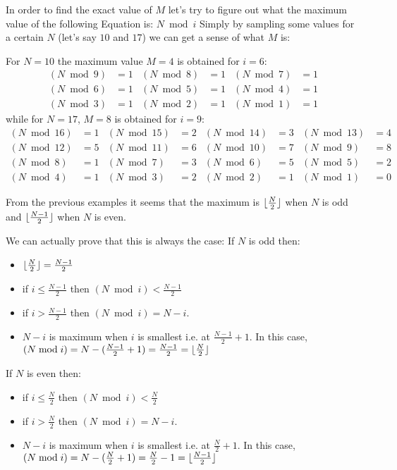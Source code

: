 In order to find the exact value of $M$ let's try to figure out what the maximum value of the following Equation is: $N \bmod{i}$
Simply by sampling some values for a certain $N$ (let's say $10$ and $17$) we can get a sense of what $M$ is:

For $N=10$ the maximum value $M=4$ is obtained for $i=6$:
\begin{align*}
	(N \bmod{9}) &= 1  & (N \bmod{8}) &= 1 & (N \bmod{7}) &= 1 \\
	(N \bmod{6}) &= 1  & (N \bmod{5}) &= 1 & (N \bmod{4}) &= 1 \\
	(N \bmod{3}) &= 1  & (N \bmod{2}) &= 1 & (N \bmod{1}) &= 1 
\end{align*}
while for $N=17$, $M=8$ is obtained for $i=9$:
\begin{align*}
	(N \bmod{16}) &= 1  & (N \bmod{15}) &= 2 & (N \bmod{14}) &= 3 & (N \bmod{13}) &= 4 \\
	(N \bmod{12}) &= 5  & (N \bmod{11}) &= 6 & (N \bmod{10}) &= 7 & (N \bmod{9})  &= 8 \\
	(N \bmod{8})  &= 1  & (N \bmod{7})  &= 3 & (N \bmod{6})  &= 5 & (N \bmod{5})  &= 2 \\
	(N \bmod{4})  &= 1  & (N \bmod{3})  &= 2 & (N \bmod{2})  &= 1 & (N \bmod{1})  &= 0 
\end{align*}

From the previous examples it seems that the maximum is $ \lfloor\frac{N}{2}\rfloor$ when $N$ is odd and $ \lfloor\frac{N-1}{2}\rfloor$  when $N$ is even.


We can actually prove that this is always the case:
If $N$ is odd then:
\begin{itemize}
	\item $\lfloor\frac{N}{2}\rfloor = \frac{N-1}{2}$
	\item if $i \leq \frac{N-1}{2}$ then $(N \bmod{i}) < \frac{N-1}{2}$
	\item if $i > \frac{N-1}{2}$ then $(N \bmod{i}) = N-i$. 
	\item $N-i$ is maximum when $i$ is smallest i.e. at $\frac{N-1}{2}+1$. In this case, $(N \bmod{i}) = N - (\frac{N-1}{2}+1) = \frac{N-1}{2} = \lfloor\frac{N}{2}\rfloor$
\end{itemize}

If $N$ is even then:
\begin{itemize}
	\item if $i \leq \frac{N}{2}$ then $(N \bmod{i}) < \frac{N}{2}$
	\item if $i > \frac{N}{2}$ then $(N \bmod{i}) = N-i$. 
	\item $N-i$ is maximum when $i$ is smallest i.e. at $\frac{N}{2}+1$. In this case, $(N \bmod{i}) = N - (\frac{N}{2}+1) = \frac{N}{2}-1 = \lfloor\frac{N-1}{2}\rfloor$
\end{itemize}

